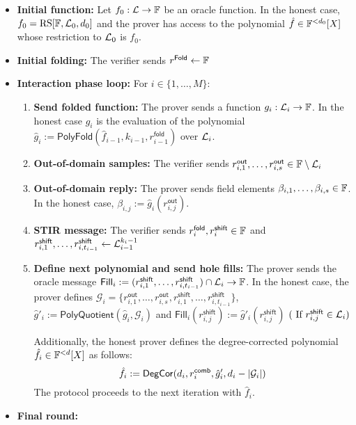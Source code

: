 \begin{itemize}
  \item\textbf{Initial function:} Let $f_0:\mathcal{L}\rightarrow\mathbb{F}$ be an oracle function. In the honest case, $f_0=\mathrm{RS}[\mathbb{F},\mathcal{L}_0,d_0]$ and the prover has access to the polynomial $\hat{f}\in\mathbb{F}^{<d_0}[X]$ whose restriction to $\mathcal{L}_0$ is $f_0$.
  \item \textbf{Initial folding:} The verifier sends $r^{\mathsf{Fold}}\gets\mathbb{F}$
  \item \textbf{Interaction phase loop:} For $i\in\{1,\ldots,M\}$:
  \begin{enumerate}
    \item \textbf{Send folded function:} The prover sends a function $g_i:\mathcal{L}_i\rightarrow\mathbb{F}$. In the honest case $g_i$ is the evaluation of the polynomial $\hat{g}_i:=\mathsf{PolyFold}(\hat{f}_{i-1},k_{i-1},r^{\mathsf{fold}}_{i-1})$ over $\mathcal{L}_i$.
    \item \textbf{Out-of-domain samples:} The verifier sends $r_{i,1}^{\mathsf{out}},\ldots,r_{i,s}^{\mathsf{out}}\in\mathbb{F}\setminus\mathcal{L}_i$
    \item \textbf{Out-of-domain reply:}
    The prover sends field elements
    $\beta_{i,1},\dots,\beta_{i,s}\in\mathbb{F}$. In the honest case,
    $\beta_{i,j}:=\hat{g}_{i}(r_{i,j}^{\mathsf{out}})$.
    \item \textbf{STIR message:} The verifier sends $r^{\mathsf{fold}}_i,r^{\mathsf{shift}}_i\in\mathbb{F}$ and $r_{i,1}^{\mathsf{shift}},\ldots,r_{i,t_{i-1}}^{\mathsf{shift}}\gets\mathcal{L}^{k_i-1}_{i-1}$
    \item \textbf{Define next polynomial and send hole fills:} The prover sends the oracle message $\mathsf{Fill}_i:=(r^{\mathsf{shift}}_{i,1},\ldots,r^{\mathsf{shift}}_{i,t_{i-1}})\cap\mathcal{L}_i\rightarrow\mathbb{F}$. In the honest case, the prover defines $\mathcal{G}_i=\{r^{\mathsf{out}}_{i,1},\ldots,r^{\mathsf{out}}_{i,s},r^{\mathsf{shift}}_{i,1},\ldots,r^{\mathsf{shift}}_{i,t_{i-1}}\}$, $\hat{g}'_i:=\mathsf{PolyQuotient}(\hat{g}_i,\mathcal{G}_i)$ and $\mathsf{Fill}_i(r^{\mathsf{shift}}_{i,j}):=\hat{g}'_i(r^{\mathsf{shift}}_{i,j})$ $(\text{ If }r^{\mathsf{shift}}_{i,j}\in\mathcal{L}_i)$

    Additionally, the honest prover defines the degree-corrected polynomial 
    $\hat{f}_i \in \mathbb{F}^{<d}[X]$ as follows:
    \[
        \hat{f}_i 
        :=\mathsf{DegCor}(d_i,r_{i}^{\mathsf{comb}},\hat{g}'_i,d_i-|\mathcal{G}_i|)
    \]
  The protocol proceeds to the next iteration with $\hat{f}_i$.
  \end{enumerate}   
  \item \textbf{Final round:} 
\end{itemize}

